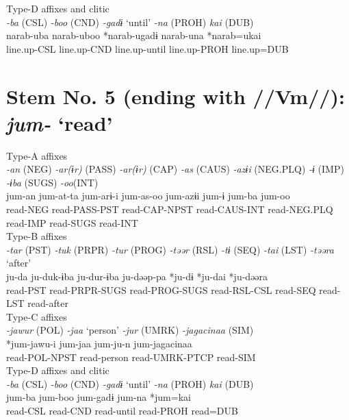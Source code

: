 \ex Type-D affixes and clitic\\
\glll \textit{-ba} (CSL)  \textit{-boo} (CND)  \textit{-gadɨ} ‘until’  \textit{-na} (PROH)  \textit{kai} (DUB)\\
narab-uba  narab-uboo  *narab-ugadɨ  narab-una  *narab=ukai\\
line.up-CSL  line.up-CND  line.up-until  line.up-PROH  line.up=DUB\\
\z

\section{Stem No. 5 (ending with //Vm//): \textit{jum-} ‘read’}

\ea Type-A affixes\\
\glll \textit{-an} (NEG)  \textit{-ar(ɨr)} (PASS)  \textit{-ar(ɨr)} (CAP)  \textit{-as} (CAUS)  \textit{-azɨi} (NEG.PLQ)  \textit{-ɨ} (IMP)  \textit{-ɨba} (SUGS)  \textit{-oo}(INT)\\
jum-an  jum-at-ta  jum-arɨ-i  jum-as-oo  jum-azɨi  jum-ɨ  jum-ba  jum-oo\\
read-NEG  read-PASS-PST  read-CAP-NPST  read-CAUS-INT  read-NEG.PLQ  read-IMP  read-SUGS  read-INT\\


\ex Type-B affixes\\
\glll \textit{-tar} (PST)  \textit{-tuk} (PRPR)  \textit{-tur} (PROG)  \textit{-təər} (RSL)  \textit{-tɨ} (SEQ)  \textit{-tai} (LST)  \textit{-təəra} ‘after’\\
ju-da  ju-duk-ɨba  ju-dur-ɨba  ju-dəəp-pa  *ju-dɨ  *ju-dai  *ju-dəəra\\
read-PST  read-PRPR-SUGS  read-PROG-SUGS  read-RSL-CSL  read-SEQ  read-LST  read-after\\


\ex Type-C affixes\\
\glll \textit{-jawur} (POL)  \textit{-jaa} ‘person’  \textit{-jur} (UMRK)  \textit{-jagacinaa} (SIM)\\
*jum-jawu-i  jum-jaa  jum-ju-n  jum-jagacinaa\\
read-POL-NPST  read-person  read-UMRK-PTCP  read-SIM\\


\ex Type-D affixes and clitic\\
\glll \textit{-ba} (CSL)  \textit{-boo} (CND)  \textit{-gadɨ} ‘until’  \textit{-na} (PROH)  \textit{kai} (DUB)\\
jum-ba  jum-boo  jum-gadɨ  jum-na  *jum=kai\\
read-CSL  read-CND  read-until  read-PROH  read=DUB\\
\z

